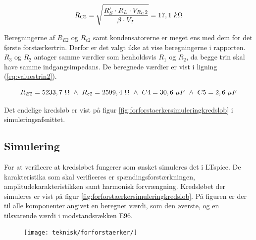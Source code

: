 \begin{equation}
R_{\mathrm{C2}} = \sqrt{\frac{R'_S \cdot R_L \cdot V_{R_C2}}{\beta \cdot V_T}} = 17,1~k\ohm
\label{eq:rc2maks}
\end{equation}

Beregningerne af $R_{E2}$ og $R_{e2}$ samt kondensatorerne er meget ens med dem for det første forstærkertrin. Derfor er det valgt ikke at vise beregningerne i rapporten. $R_3$ og $R_2$ antager samme værdier som henholdsvis $R_1$ og $R_2$, da begge trin skal have samme indgangsimpedans. De beregnede værdier er vist i ligning (\ref{eq:valuestrin2}).

\begin{equation}
R_{E2}=5233,7~\ohm ~ \wedge ~R_{e2}=2599,4~\ohm ~ \wedge ~ C4=30,6~\mu F ~ \wedge ~ C5=2,6~\mu F
\label{eq:valuestrin2}
\end{equation}

Det endelige kredsløb er vist på figur \ref{fig:forforstaerkersimuleringkredslob} i simuleringsafsnittet.

\subsection*{Simulering}

For at verificere at kredsløbet fungerer som ønsket simuleres det i LTspice. De karakteristika som skal verificeres er spændingsforstærkningen, amplitudekarakteristikken samt harmonisk forvrængning. Kredsløbet der simuleres er vist på figur \ref{fig:forforstaerkersimuleringkredslob}. På figuren er der til alle komponenter angivet en beregnet værdi, som den øverste, og en tilsvarende værdi i modstandsrækken E96. 

\begin{figure}[h]
\centering
\texttt{[image: teknisk/forforstaerker/]}
\caption{}
\label{}
\end{figure}


